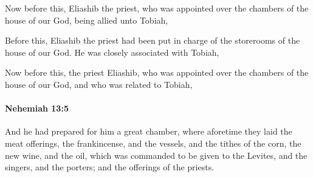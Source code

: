 			\begin{versebox}
					\item[BHS] 
					\item[LXX] 
					\item[ASV] Now before this, Eliashib the priest, who was appointed over the chambers of the house of our God, being allied unto Tobiah,
					\item[NIV] Before this, Eliashib the priest had been put in charge of the storerooms of the house of our God. He was closely associated with Tobiah,
					\item[NRSV] Now before this, the priest Eliashib, who was appointed over the chambers of the house of our God, and who was related to Tobiah,
			\end{versebox}

		\paragraph{Nehemiah 13:5} %
			\label{NEHEMIAH-13-5}

			And he had prepared for him a great chamber, where aforetime they laid the meat offerings, the frankincense, and the vessels, and the tithes of the corn, the new wine, and the oil, which was commanded to be given to the Levites, and the singers, and the porters; and the offerings of the priests.

